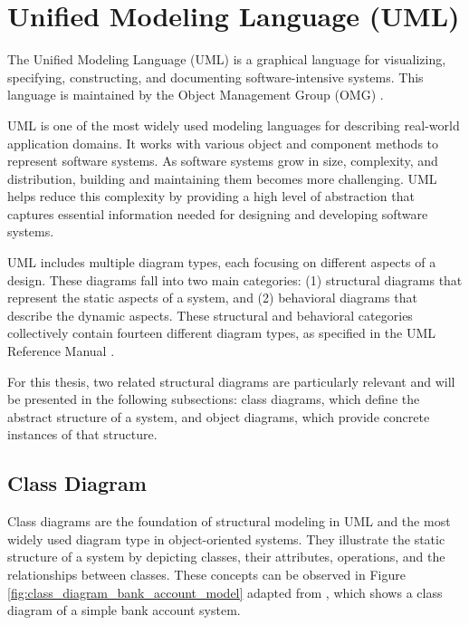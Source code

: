 \section{Unified Modeling Language (UML)}

\hspace{1cm} The Unified Modeling Language (UML) is a graphical language for 
visualizing, specifying, constructing, and documenting software-intensive systems. 
This language is maintained by the Object Management Group (OMG) \cite{UML}.

UML is one of the most widely used modeling languages for describing real-world 
application domains. It works with various object and component methods to represent 
software systems. As software systems grow in size, complexity, and distribution, 
building and maintaining them becomes more challenging. UML helps reduce this 
complexity by providing a high level of abstraction that captures essential 
information needed for designing and developing software systems.

UML includes multiple diagram types, each focusing on different aspects of a design. 
These diagrams fall into two main categories: (1) structural diagrams that represent 
the static aspects of a system, and (2) behavioral diagrams that describe the dynamic 
aspects. These structural and behavioral categories collectively contain fourteen 
different diagram types, as specified in the UML Reference Manual \cite{UML_Reference_Manual}.

For this thesis, two related structural diagrams are particularly relevant and will be presented in the following subsections: class diagrams, which define the abstract structure of a system, and object diagrams, which provide concrete instances of that structure.


\subsection{Class Diagram}
Class diagrams are the foundation of structural modeling in UML and the most widely 
used diagram type in object-oriented systems. They illustrate the static structure 
of a system by depicting classes, their attributes, operations, and the relationships 
between classes. These concepts can be observed in Figure 
\ref{fig:class_diagram_bank_account_model} adapted from \cite{TPV}, 
which shows a class diagram of a simple bank account system.

